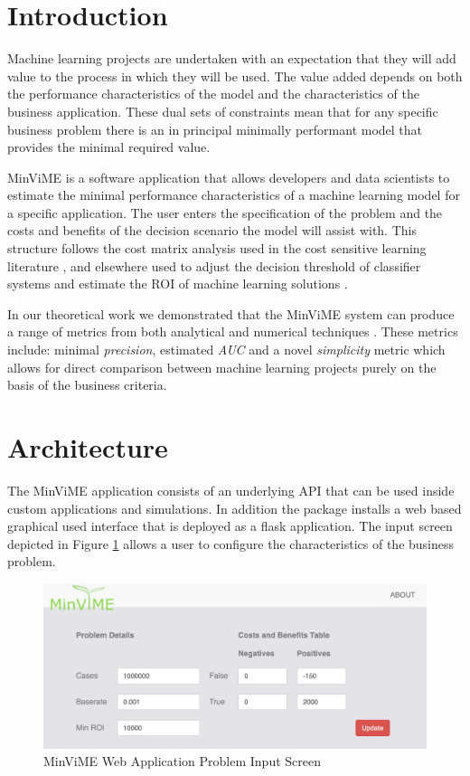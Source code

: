 \documentclass[preprint,12pt, a4paper]{elsarticle}
\begin{document}
\noindent

\section{Introduction}

Machine learning projects are undertaken with an expectation
that they will add value to the process in which they will be used.
The value added depends on both the performance characteristics of the model
and the characteristics of the business application. These dual sets
of constraints mean that for any specific business problem there is an
in principal minimally performant model that provides the minimal required
value.

MinViME is a software application that allows developers and data scientists
to estimate the minimal performance characteristics of a machine learning
model for a specific application. The user enters the specification of the problem
and the costs and benefits of the decision scenario the model will assist with.
This structure follows the cost matrix analysis used in the cost sensitive learning
literature \cite{Domingos1999,Margineantu2000,Elkan2001,Tian+Zhang2019}, and
elsewhere used to adjust the decision threshold of classifier systems \cite{Nikolaou2016}
and estimate the ROI of machine learning solutions \cite{Ylijoki2018}.
 
In our theoretical work we demonstrated that the MinViME system can produce a range of metrics 
from both analytical and numerical techniques \cite{Hawkins2020}. These metrics include: 
minimal \textit{precision}, estimated \textit{AUC} and a novel \textit{simplicity}  
metric which allows for direct comparison between machine learning projects purely 
on the basis of the business criteria.

\section{Architecture}

The MinViME application consists of an underlying API that can be used inside custom
applications and simulations. In addition the package installs a web based graphical
used interface that is deployed as a flask application. The input screen depicted
in Figure \ref{screen1} allows a user to configure the characteristics of the business
problem. 

\begin{figure}[h!]
\includegraphics[scale=0.5]{images/Screen1.png}
\caption{MinViME Web Application Problem Input Screen}
\label{screen1}
\end{figure}
\end{document}
